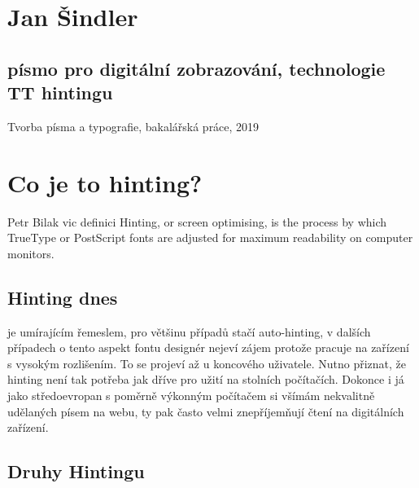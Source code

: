 \documentclass{article}
\begin{document}
\section*{Jan Šindler}
\subsection*{písmo pro digitální zobrazování, technologie TT hintingu}
Tvorba písma a typografie, bakalářská práce, 2019\\



\section{Co je to hinting?}

Petr Bilak \* vic definici \* Hinting, or screen optimising, is the process by which TrueType or PostScript fonts are adjusted for maximum readability on computer monitors.



\subsection{Hinting dnes}

je umírajícím řemeslem, pro většinu případů stačí auto-hinting, v dalších případech o tento aspekt fontu designér nejeví zájem protože pracuje na zařízení s vysokým rozlišením. To se projeví až u koncového uživatele. Nutno přiznat, že hinting není tak potřeba jak dříve pro užití na stolních počítačích. Dokonce i já jako středoevropan s poměrně výkonným počítačem si všímám nekvalitně udělaných písem na webu, ty pak často velmi znepříjemňují čtení na digitálních zařízení. 


\subsection{Druhy Hintingu}
\end{document}
